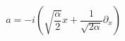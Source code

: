 \begin{equation}
a = -i \left( \sqrt{\frac{\alpha}{ 2}}x + \frac{1}{ \sqrt{2 \alpha}}
  \partial_x   \right)
\end{equation}

